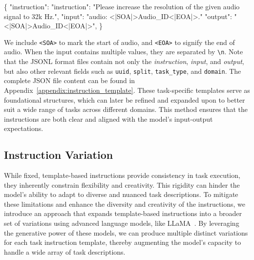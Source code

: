 \begin{tcolorbox}[colback=white, colframe=black, boxrule=0.2mm, arc=0mm, title=Sound Super-resolution]
\{
"instruction": "instruction": "Please increase the resolution of the given audio signal to 32k Hz.", 
"input": "audio: <|SOA|>Audio\_ID<|EOA|>."
 "output": "<|SOA|>Audio\_ID<|EOA|>",
\}
\end{tcolorbox}


We include \texttt{<SOA>} to mark the start of audio, and \texttt{<EOA>} to signify the end of audio. When the input contains multiple values, they are separated by \texttt{\textbackslash n}. Note that the JSONL format files contain not only the \textit{instruction}, \textit{input}, and \textit{output}, but also other relevant fields such as \texttt{uuid}, \texttt{split}, \texttt{task\_type}, and \texttt{domain}. The complete JSON file content can be found in Appendix~\ref{appendix:instruction_template}. These task-specific templates serve as foundational structures, which can later be refined and expanded upon to better suit a wide range of tasks across different domains. This method ensures that the instructions are both clear and aligned with the model's input-output expectations.




\subsection{Instruction Variation}\label{sec:self_instruct}
While fixed, template-based instructions provide consistency in task execution, they inherently constrain flexibility and creativity. This rigidity can hinder the model’s ability to adapt to diverse and nuanced task descriptions. To mitigate these limitations and enhance the diversity and creativity of the instructions, we introduce an approach that expands template-based instructions into a broader set of variations using advanced language models, like LLaMA~\citep{touvron2023llama}. By leveraging the generative power of these models, we can produce multiple distinct variations for each task instruction template, thereby augmenting the model's capacity to handle a wide array of task descriptions.

